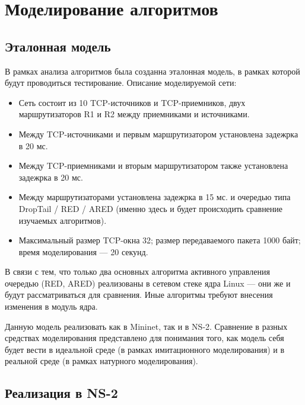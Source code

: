 \chapter{Моделирование алгоритмов}
\label{chap2}

\section{Эталонная модель}
\label{chap2:sec1}

В рамках анализа алгоритмов была созданна эталонная модель, в рамках которой
будут проводиться тестирование. Описание моделируемой сети:

\begin{itemize}

        \item Сеть состоит из 10 TCP-источников и TCP-приемников, двух
                маршрутизаторов R1 и R2 между приемниками и источниками.

        \item Между TCP-источниками и первым маршрутизатором установлена
                задежрка в 20 мс.

        \item Между TCP-приемниками и вторым маршрутизатором также установлена
                задежрка в 20 мс.

        \item Между маршрутизаторами установлена задежрка в 15 мс. и очередью
                типа DropTail / RED / ARED (именно здесь и будет происходить
                сравнение изучаемых алгоритмов).

        \item Максимальный размер TCP-окна 32; размер передаваемого пакета 1000
                байт; время моделирования --- 20 секунд.

\end{itemize}

В связи с тем, что только два основных алгоритма активного управления очередью
(RED, ARED) реализованы в сетевом стеке ядра Linux --- они же и будут
рассматриваться для сравнения. Иные алгоритмы требуют внесения изменения в
модуль ядра.

Данную модель реализовать как в Mininet, так и в NS-2. Сравнение в разных
средствах моделирования представлено для понимания того, как модель себя будет
вести в идеальной среде (в рамках имитационного моделирования) и в реальной
среде (в рамках натурного моделирования). 

\section{Реализация в NS-2} %
\label{chap2:sec2}

